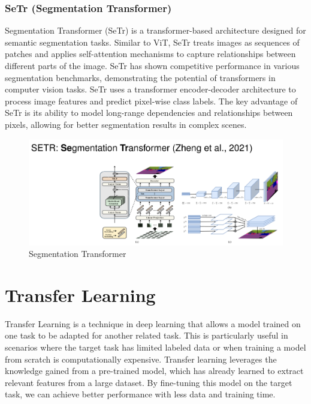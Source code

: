 \subsubsection{SeTr (Segmentation Transformer)}
Segmentation Transformer (SeTr) is a transformer-based architecture designed for semantic segmentation tasks. Similar to ViT, SeTr treats images as sequences of patches and applies self-attention mechanisms to capture relationships between different parts of the image. SeTr has shown competitive performance in various segmentation benchmarks, demonstrating the potential of transformers in computer vision tasks.
SeTr uses a transformer encoder-decoder architecture to process image features and predict pixel-wise class labels. The key advantage of SeTr is its ability to model long-range dependencies and relationships between pixels, allowing for better segmentation results in complex scenes.
\begin{figure}[htbp]
   \centering
   \includegraphics{images/10/setr.png}
   \caption{Segmentation Transformer}
   \label{fig:10/setr}
\end{figure}

\section{Transfer Learning}

Transfer Learning is a technique in deep learning that allows a model trained on one task to be adapted for another related task. This is particularly useful in scenarios where the target task has limited labeled data or when training a model from scratch is computationally expensive.
Transfer learning leverages the knowledge gained from a pre-trained model, which has already learned to extract relevant features from a large dataset. By fine-tuning this model on the target task, we can achieve better performance with less data and training time.

